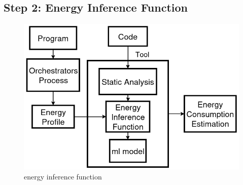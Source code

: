 \documentclass[sigplan]{acmart}
\begin{document}
\subsection{Step 2: Energy Inference Function} \label{sec:work_step2_energy_inference_function}

\begin{figure}%
  \centering
  \includegraphics[width = 0.4 \textwidth]{figures/energy_inf_fun.png}
  \caption{energy inference function}
  \label{fig:energy_inference_function}
\end{figure}
\end{document}
